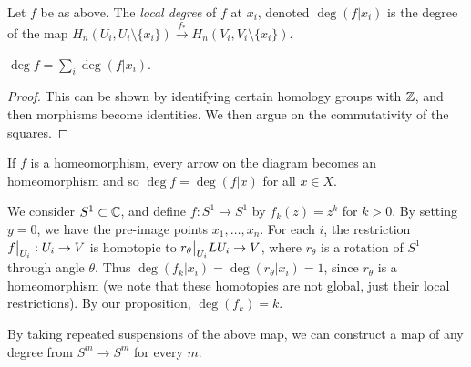 \begin{definition}
  Let $f$ be as above. The \emph{local degree} of $f$ at $x_i$, denoted $\deg(f|x_i)$ is the degree of the map $H_n(U_i, U_i \setminus \{x_i\}) \xrightarrow{f_*} H_n(V_i, V_i \setminus \{x_i\})$.
\end{definition}

\begin{proposition}
  $\deg f = \sum_i \deg(f|x_i)$.
\end{proposition}

\begin{proof}
  This can be shown by identifying certain homology groups with $\mathbb{Z}$, and then morphisms become identities. We then argue on the commutativity of the squares. 
\end{proof}

\begin{example}
  If $f$ is a homeomorphism, every arrow on the diagram becomes an homeomorphism and so $\deg f = \deg(f|x)$ for all $x \in X$. 
\end{example}

\begin{example}
  We consider $S^1 \subset \mathbb{C}$, and define $f: S^1 \to S^1$ by $f_k(z) = z^k$ for $k > 0$. By setting $y = 0$, we have the pre-image points $x_1, \ldots, x_n$. For each $i$, the restriction $\restr f{U_i}: U_i \to V$ is homotopic to $\restr{r_\theta}{U_i}L U_i \to V$, where $r_\theta$ is a rotation of $S^1$ through angle $\theta$. Thus $\deg(f_k|x_i) = \deg(r_\theta|x_i) = 1$, since $r_\theta$ is a homeomorphism (we note that these homotopies are not global, just their local restrictions). By our proposition, $\deg(f_k) = k$.
\end{example}

\begin{example}
  By taking repeated suspensions of the above map, we can construct a map of any degree from $S^m \to S^m$ for every $m$. 
\end{example}